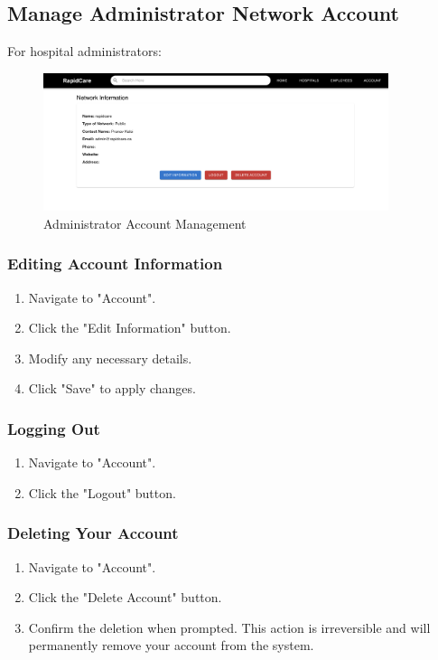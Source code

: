 \documentclass[12pt, titlepage]{article}
\begin{document}
\subsection{Manage Administrator Network Account}
For hospital administrators:

\begin{figure}[H]
\centering
\includegraphics[width=0.9\textwidth]{account.png}
\caption{Administrator Account Management}
\label{fig:Administrator Account Management}
\end{figure}

\subsubsection{Editing Account Information}
\begin{enumerate}
    \item Navigate to "Account".
    \item Click the "Edit Information" button.
    \item Modify any necessary details.
    \item Click "Save" to apply changes.
\end{enumerate}

\subsubsection{Logging Out}
\begin{enumerate}
    \item Navigate to "Account".
    \item Click the "Logout" button.
\end{enumerate}

\subsubsection{Deleting Your Account}
\begin{enumerate}
    \item Navigate to "Account".
    \item Click the "Delete Account" button.
    \item Confirm the deletion when prompted. This action is irreversible and will permanently remove your account from the system.
\end{enumerate}
\end{document}
